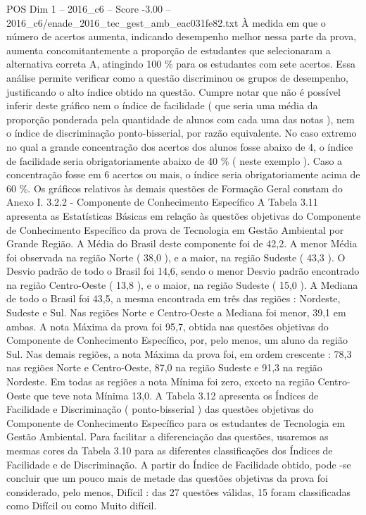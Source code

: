 \begin{textsample}{POS Dim 1 – 2016\_c6 – Score -3.00 – 2016\_c6/enade\_2016\_tec\_gest\_amb\_eac031fe82.txt}
À medida em que o número de acertos aumenta, indicando desempenho melhor nessa parte da prova, aumenta concomitantemente a proporção de estudantes que selecionaram a alternativa correta A, atingindo 100 \% para os estudantes com sete acertos.
Essa análise permite verificar como a questão discriminou os grupos de desempenho, justificando o alto índice obtido na questão.
Cumpre notar que não é possível inferir deste gráfico nem o índice de facilidade ( que seria uma média da proporção ponderada pela quantidade de alunos com cada uma das notas ), nem o índice de discriminação ponto-bisserial, por razão equivalente.
No caso extremo no qual a grande concentração dos acertos dos alunos fosse abaixo de 4, o índice de facilidade seria obrigatoriamente abaixo de 40 \% ( neste exemplo ).
Caso a concentração fosse em 6 acertos ou mais, o índice seria obrigatoriamente acima de 60 \%.
Os gráficos relativos às demais questões de Formação Geral constam do Anexo I. 3.2.2 - Componente de Conhecimento Específico A Tabela 3.11 apresenta as Estatísticas Básicas em relação às questões objetivas do Componente de Conhecimento Específico da prova de Tecnologia em Gestão Ambiental por Grande Região.
A Média do Brasil deste componente foi de 42,2.
A menor Média foi observada na região Norte ( 38,0 ), e a maior, na região Sudeste ( 43,3 ).
O Desvio padrão de todo o Brasil foi 14,6, sendo o menor Desvio padrão encontrado na região Centro-Oeste ( 13,8 ), e o maior, na região Sudeste ( 15,0 ).
A Mediana de todo o Brasil foi 43,5, a mesma encontrada em três das regiões : Nordeste, Sudeste e Sul.
Nas regiões Norte e Centro-Oeste a Mediana foi menor, 39,1 em ambas.
A nota Máxima da prova foi 95,7, obtida nas questões objetivas do Componente de Conhecimento Específico, por, pelo menos, um aluno da região Sul.
Nas demais regiões, a nota Máxima da prova foi, em ordem crescente : 78,3 nas regiões Norte e Centro-Oeste, 87,0 na região Sudeste e 91,3 na região Nordeste.
Em todas as regiões a nota Mínima foi zero, exceto na região Centro-Oeste que teve nota Mínima 13,0.
A Tabela 3.12 apresenta os Índices de Facilidade e Discriminação ( ponto-bisserial ) das questões objetivas do Componente de Conhecimento Específico para os estudantes de Tecnologia em Gestão Ambiental.
Para facilitar a diferenciação das questões, usaremos as mesmas cores da Tabela 3.10 para as diferentes classificações dos Índices de Facilidade e de Discriminação.
A partir do Índice de Facilidade obtido, pode -se concluir que um pouco mais de metade das questões objetivas da prova foi considerado, pelo menos, Difícil : das 27 questões válidas, 15 foram classificadas como Difícil ou como Muito difícil.

\end{textsample}
